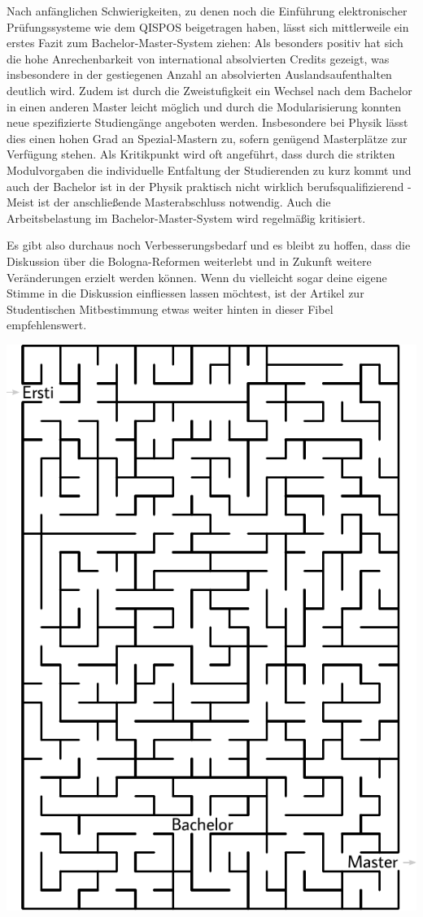 \begin{multicols}{2}
Nach anfänglichen Schwierigkeiten, zu denen noch die Einführung elektronischer Prüfungssysteme wie dem QISPOS beigetragen haben, lässt sich mittlerweile ein erstes Fazit zum Bachelor-Master-System ziehen:
Als besonders positiv hat sich die hohe Anrechenbarkeit von international absolvierten Credits gezeigt, was insbesondere in der gestiegenen Anzahl an absolvierten Auslandsaufenthalten deutlich wird. Zudem ist durch die Zweistufigkeit ein Wechsel nach dem Bachelor in einen anderen Master leicht möglich und durch die Modularisierung konnten neue spezifizierte Studiengänge angeboten werden. Insbesondere bei Physik lässt dies einen hohen Grad an Spezial-Mastern zu, sofern genügend Masterplätze zur Verfügung stehen.
Als Kritikpunkt wird oft angeführt, dass durch die strikten Modulvorgaben die individuelle Entfaltung der Studierenden zu kurz kommt und auch der Bachelor ist in der Physik praktisch nicht wirklich berufsqualifizierend - Meist ist der anschließende Masterabschluss notwendig. Auch die Arbeitsbelastung im Bachelor-Master-System wird regelmäßig kritisiert.

Es gibt also durchaus noch Verbesserungsbedarf und es bleibt zu hoffen, dass die Diskussion über die Bologna-Reformen weiterlebt und in Zukunft weitere Veränderungen erzielt werden können. Wenn du vielleicht sogar deine eigene Stimme in die Diskussion einfliessen lassen möchtest, ist der Artikel zur Studentischen Mitbestimmung etwas weiter hinten in dieser Fibel empfehlenswert. 


\vspace{3ex}

\includegraphics[width=\columnwidth]{res/bachelor_master_labyrinth.pdf}
\end{multicols}
